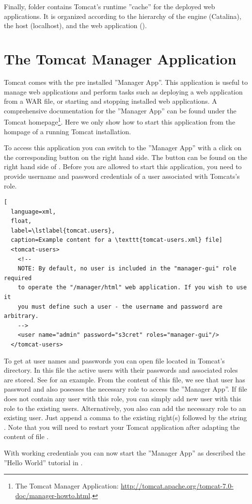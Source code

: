\documentclass[a4paper,10pt,twoside]{book}
\begin{document}
Finally, folder  contains Tomcat's runtime ''cache'' for the deployed web applications.
It is organized according to the hierarchy of the engine (Catalina), the host (localhost), and the web application ().

\section{The Tomcat Manager Application}

Tomcat comes with the pre installed ''Manager App''.
This application is useful to manage web applications and perform tasks such as deploying a web application from a WAR file, or starting and stopping installed web applications.
A comprehensive documentation for the ''Manager App'' can be found under the Tomcat homepage\footnote{
The Tomcat Manager Application: \url{http://tomcat.apache.org/tomcat-7.0-doc/manager-howto.html}.
}.
Here we only show how to start this application from the hompage of a running Tomcat installation.

To access this application you can switch to the ''Manager App'' with a click on the corresponding button on the right hand side.
The button can be found on the right hand side of .
Before you are allowed to start this application, you need to provide username and password credentials of a user associated with Tomcats's  role.

\begin{lstlisting}[
  language=xml,
  float,
  label=\lstlabel{tomcat.users},
  caption=Example content for a \texttt{tomcat-users.xml} file]
  <tomcat-users>
    <!--
    NOTE: By default, no user is included in the "manager-gui" role required
    to operate the "/manager/html" web application. If you wish to use it
    you must define such a user - the username and password are arbitrary.
    -->
	<user name="admin" password="s3cret" roles="manager-gui"/>
  </tomcat-users>	
\end{lstlisting}

To get at user names and passwords you can open file  located in Tomcat's  directory.
In this file the active users with their passwords and associated roles are stored.
See  for an example.
From the content of this file, we see that user  has password  and also posesses the necessary role  to access the ''Manager App''.
If file  does not contain any user with this role, you can simply add new user with this role to the existing users.
Alternatively, you also can add the necessary role to an existing user.
Just append a comma to the existing right(s) followed by the string .
Note that you will need to restart your Tomcat application after adapting the content of file .

With working credentials you can now start the ''Manager App'' as described the ''Hello World'' tutorial in .


\ifx\wholebook\relax\else
   
   
\end{document}
